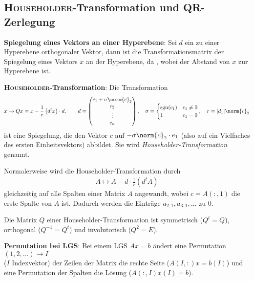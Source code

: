 \pagebreak

\subsection{%
    \textsc{Householder}-Transformation und QR-Zerlegung%
}

\textbf{Spiegelung eines Vektors an einer Hyperebene}:
Sei $d$ ein zu einer Hyperebene orthogonaler Vektor, dann ist
 die Transformationsmatrix
der Spiegelung eines Vektors $x$ an der Hyperebene,
da ,
wobei  der Abstand von $x$ zur
Hyperebene ist.

\linie

\textbf{\textsc{Householder}-Transformation}: Die Transformation
\begin{align*}
    x \mapsto Qx = x - \frac{1}{r} \left(d^t x\right) \cdot d, \qquad
    d = \begin{pmatrix}c_1 + \sigma \norm{c}_2 \\ c_2 \\ \vdots \\
    c_n\end{pmatrix}, \quad
    \sigma = \begin{cases}\sgn(c_1) & c_1 \not= 0 \\
    1 & c_1 = 0\end{cases}, \quad
    r = |d_1| \norm{c}_2
\end{align*}
ist eine Spiegelung, die den Vektor
$c$ auf $-\sigma \norm{c}_2 \cdot e_1$ (also auf ein Vielfaches des
ersten Einheitsvektors) abbildet.
Sie wird \emph{Householder-Transformation} genannt.

Normalerweise wird die Householder-Transformation durch
\begin{align*}
    A \mapsto A - d \cdot \frac{1}{r} \left(d^t A\right)
\end{align*}
gleichzeitig auf alle Spalten einer Matrix $A$ angewandt, wobei $c = A(:, 1)$
die erste Spalte von $A$ ist.
Dadurch werden die Einträge $a_{2,1}, a_{3,1}, \dotsc$ zu $0$.

Die Matrix $Q$ einer Householder-Transformation ist symmetrisch ($Q^t = Q$), \\
orthogonal ($Q^{-1} = Q^t$) und involutorisch ($Q^2 = E$).

\linie

\textbf{Permutation bei LGS}:
Bei einem LGS $Ax = b$ ändert eine Permutation
$(1, 2, \dotsc) \rightarrow I$ \\
($I$ Indexvektor) der Zeilen der Matrix die rechte Seite ($A(I,:) x = b(I)$)
und eine Permutation der Spalten die Lösung ($A(:,I) x(I) = b$).


